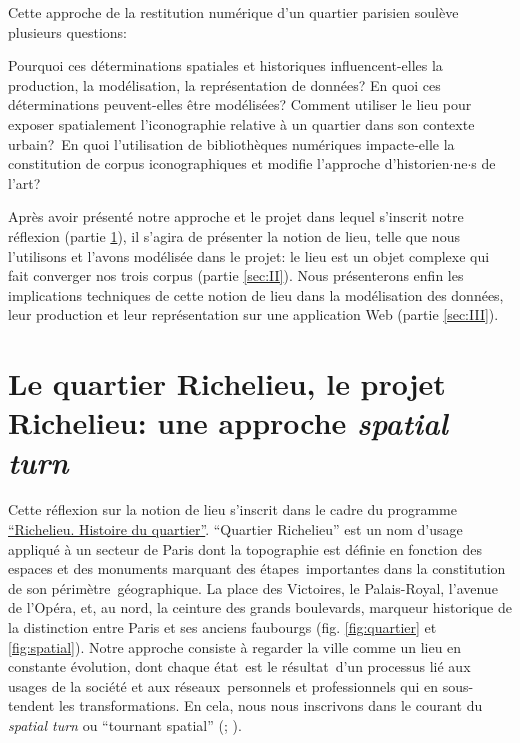 \documentclass[11pt,french]{article}
\begin{document}
Cette approche de la restitution numérique d'un quartier parisien soulève plusieurs questions:

Pourquoi ces déterminations spatiales et historiques influencent-elles la production, la modélisation, la représentation de données? En quoi ces déterminations peuvent-elles être modélisées? Comment utiliser le lieu pour exposer spatialement l'iconographie relative à un quartier dans son contexte urbain? En quoi l'utilisation de bibliothèques numériques impacte-elle la constitution de corpus iconographiques et modifie l'approche d'historien$\cdot$ne$\cdot$s de l'art?

Après avoir présenté notre approche et le projet dans lequel s'inscrit notre réflexion (partie \ref{sec:I}), il s'agira de présenter la notion de lieu, telle que nous l'utilisons et l'avons modélisée dans le projet: le lieu est un objet complexe qui fait converger nos trois corpus (partie \ref{sec:II}). Nous présenterons enfin les implications techniques de cette notion de lieu dans la modélisation des données, leur production et leur représentation sur une application Web (partie \ref{sec:III}).

\section{Le quartier Richelieu, le projet Richelieu: une approche \textit{spatial turn}}
\label{sec:I}
Cette réflexion sur la notion de lieu s'inscrit dans le cadre du programme \href{https://www.inha.fr/fr/recherche/le-departement-des-etudes-et-de-la-recherche/domaines-de-recherche/histoire-des-collections-histoire-des-institutions-artistiques-et-culturelles-economie-de-l-art/richelieu-histoire-du-quartier.html}{\enquote{Richelieu. Histoire du quartier}}. \enquote{Quartier Richelieu} est un nom d'usage appliqué à un secteur de Paris dont la topographie est définie en fonction des espaces et des monuments marquant des étapes importantes dans la constitution de son périmètre géographique. La place des Victoires, le Palais-Royal, l'avenue de l'Opéra, et, au nord, la ceinture des grands boulevards, marqueur historique de la distinction entre Paris et ses anciens faubourgs (fig. \ref{fig:quartier} et \ref{fig:spatial}). Notre approche consiste à regarder la ville comme un lieu en constante évolution, dont chaque état est le résultat d'un processus lié aux usages de la société et aux réseaux personnels et professionnels qui en sous-tendent les transformations. En cela, nous nous inscrivons dans le courant du \textit{spatial turn} ou \enquote{tournant spatial} (\citealp[p. 15-16]{bodenhamer_potential_2010}; \citealp{ayers_turning_2010}).
\end{document}

